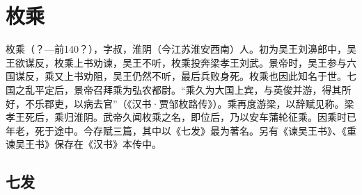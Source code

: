 \chapter{枚乘}

\begin{authorintro}
枚乘（？—前140？），字叔，淮阴（今江苏淮安西南）人。初为吴王刘濞郎中，吴王欲谋反，枚乘上书劝谏，吴王不听，枚乘投奔梁孝王刘武。景帝时，吴王参与六国谋反，乘又上书劝阻，吴王仍然不听，最后兵败身死。枚乘也因此知名于世。七国之乱平定后，景帝召拜乘为弘农都尉。“乘久为大国上宾，与英俊并游，得其所好，不乐郡吏，以病去官”（《汉书·贾邹枚路传》）。乘再度游梁，以辞赋见称。梁孝王死后，乘归淮阴。武帝久闻枚乘之名，即位后，乃以安车蒲轮征乘。因乘时已年老，死于途中。今存赋三篇，其中以《七发》最为著名。另有《谏吴王书》、《重谏吴王书》保存在《汉书》本传中。
\end{authorintro}

\section[七发]{七发}

